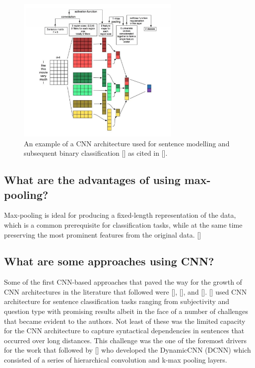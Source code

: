 \documentclass[12pt, a4paper]{report}
\theoremstyle{definition}
\theoremstyle{definition}%
\theoremstyle{definition}%
\theoremstyle{definition}%
\theoremstyle{definition}%
\theoremstyle{definition}%
\renewcommand{\cite}[1]{[\citealp{#1}]}
\begin{document}
\begin{figure}[!ht]
    \centering
    \includegraphics[width=0.7\textwidth]{fyp_template/figures/cnn_architecture.jpg}
    \caption{An example of a CNN architecture used for sentence modelling and subsequent binary classification \cite{yezhang2015} as cited in \cite{young2017}.}
    \label{fig:cnn_architecture}
\end{figure}

\subsection{What are the advantages of using max-pooling?}
Max-pooling is ideal for producing a fixed-length representation of the data, which is a common prerequisite for classification tasks, while at the same time preserving the most prominent features from the original data. \cite{young2017}

\subsection{What are some approaches using CNN?}
Some of the first CNN-based approaches that paved the way for the growth of CNN architectures in the literature that followed were \cite{collobert2011}, \cite{kim}, and \cite{kalchbrenner2014}.
\cite{kim} used CNN architecture for sentence classification tasks ranging from subjectivity and question type with promising results albeit in the face of a number of challenges that became evident to the authors. Not least of these was the limited capacity for the CNN architecture to capture syntactical dependencies in sentences that occurred over long distances. This challenge was the one of the foremost drivers for the work that followed by \cite{kalchbrenner2014} who developed the DynamicCNN (DCNN) which consisted of a series of hierarchical convolution and k-max pooling layers.
\end{document}
